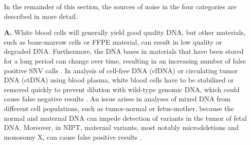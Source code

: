 In the remainder of this section, the sources of noise in the four categories are described in more detail.

\textbf{A.} White blood cells will generally yield good quality DNA, but other materials, such as bone-marrow cells or FFPE material, can result in low quality or degraded DNA. 
Furthermore, the DNA bases in materials that have been stored for a long period can change over time, resulting in an increasing number of false positive SNV calls \cite{Guyard_2017}. 
In analysis of cell-free DNA (cfDNA) or circulating tumor DNA (ctDNA) using blood plasma, white blood cells have to be stabilized or removed quickly to prevent dilution with wild-type genomic DNA, which could cause false negative results \cite{Medina_Diaz_2016}. 
An issue arises in analyses of mixed DNA from different cell populations, such as tumor-normal or fetus-mother, because the normal and maternal DNA can impede detection of variants in the tumor of fetal DNA. 
Moreover, in NIPT, maternal variants, most notably microdeletions and monosomy X, can cause false positive results \cite{Mather_2016,Reiss_2017}. 



